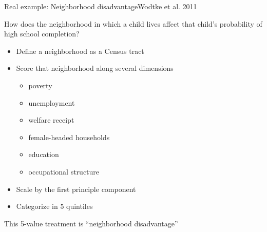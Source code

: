 \documentclass{beamer}
\begin{document}
\begin{frame}{Real example: Neighborhood disadvantage}{Wodtke et al. 2011}

How does the neighborhood in which a child lives affect that child's probability of high school completion? \pause

\begin{itemize}
\item Define a neighborhood as a Census tract \pause
\item Score that neighborhood along several dimensions
\begin{itemize}
\item poverty
\item unemployment
\item welfare receipt
\item female-headed households
\item education
\item occupational structure
\end{itemize} \pause
\item Scale by the first principle component \pause
\item Categorize in 5 quintiles \pause
\end{itemize}
This 5-value treatment is ``neighborhood disadvantage''

\end{frame}

\end{document}

